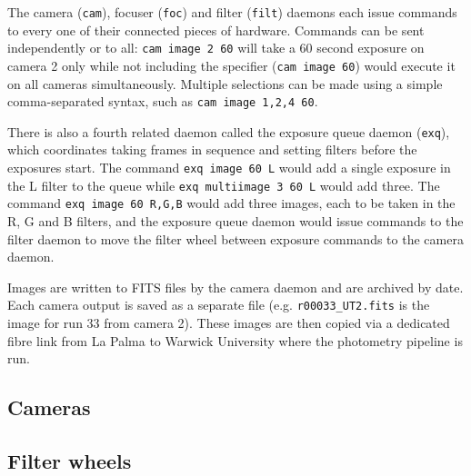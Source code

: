 \begin{colsection}
\begin{colsection}
The camera (\texttt{cam}), focuser (\texttt{foc}) and filter (\texttt{filt}) daemons each issue commands to every one of their connected pieces of hardware. Commands can be sent independently or to all: \texttt{cam~image~2~60} will take a 60 second exposure on camera 2 only while not including the specifier (\texttt{cam~image~60}) would execute it on all cameras simultaneously. Multiple selections can be made using a simple comma-separated syntax, such as \texttt{cam~image~1,2,4~60}.

There is also a fourth related daemon called the exposure queue daemon (\texttt{exq}), which coordinates taking frames in sequence and setting filters before the exposures start. The command \texttt{exq~image~60~L} would add a single exposure in the L filter to the queue while \texttt{exq~multiimage~3~60~L} would add three. The command \texttt{exq~image~60~R,G,B} would add three images, each to be taken in the R, G and B filters, and the exposure queue daemon would issue commands to the filter daemon to move the filter wheel between exposure commands to the camera daemon.

Images are written to FITS files by the camera daemon and are archived by date. Each camera output is saved as a separate file (e.g. \texttt{r00033\_UT2.fits} is the image for run 33 from camera 2). These images are then copied via a dedicated fibre link from La Palma to Warwick University where the photometry pipeline is run.

\end{colsection}


\subsection{Cameras}
\label{sec:cam}
\begin{colsection}
\end{colsection}


\subsection{Filter wheels}
\label{sec:filt}
\begin{colsection}
\end{colsection}


\end{colsection}
